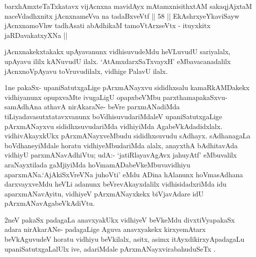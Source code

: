 \begin{shl}
barxhAmxteTaTxkatavx vijAcnxna mavidAyx mAtamxnisithxtAM
sakaqjAjxtaM naceVdadhxnitx jAcnxnameVva na tadaBxveVtf || 58 ||
EkAshrxyeYkaviSayw jAcnxnamoVhw tadhAsati
abAdhikaM tamoV\s tArxseVtx - ituyxkitx jaRDavakatxyXNa ||
\end{shl}

\begin{artha}
jAcnxnakekxtakakx upAyavanunx vidhisuvudeMdu heVLuvudU sariyalalx,
upAyavu ililx kANuvudU ilalx. `AtAmxdarxSaTxvayxH' eMbavacanadalilx 
jAcnxnoVpAyavu toVruvudilalx, vidhige PalavU ilalx.
\end{artha}

\centerline{}

\begin{artha}
1ne pakaSx- upaniSatutxgaLige pArxmANayxvu sididhxsalu kamaRkAMDakekx
vidhiyanunx opupxvaMte ivugaLigU opapxbeVMbu parxthamapakaSxvu-
samAdhAna athavA nirAkaraNe- beVre parxmANadiMda
tiLiyadavasutxtatavxvanunx boVdhisuvudariMdaleV upaniSatutxgaLige
pArxmANayxvu sididhxsuvudariMda vidhiyiMda
AgabeVkAdadidxlalx. vidhivAkayxkUkx pArxmANayxveMbudu sididhxsuvudu
sAdhayx. sAdhanagaLa boVdhaneyiMdale horatu vidhiyeMbudariMda alalx,
anayxthA bAdhitavAda vidhiyU parxmANavAdhiVtu;  udA:- `jatiRlayavAgAvx ja{\null}huyAtf'
eMbuvalilx araNayxtilada gaMjiyiMda  hoVmamADabeVkeMbuvavidhiyu
aparxmANa.`AjAkiSxVreVNa juhoVti' eMdu ADina hAlanunx hoVmasAdhana darxvayxveMdu
heVLi adanunx beVrevAkayxdalilx vidhisidadxriMda idu aparxmANavAyitu,
vidhiyeV pArxmANayxkekx biVjavAdare idU  pArxmANavAgabeVkAdiVtu.
\end{artha}

\begin{artha}
2neV pakaSx padagaLa anavxyakUkx vidhiyeV beVkeMdu divxtiVyapakaSx adara nirAkarANe- padagaLige Aguva anavxyakekx kirxyemAtarx beVkAguvudeV horatu vidhiyu beVkilalx, asitx, asimx itAyxdikirxyApadagaLu upaniSatutxgaLalUlx ive, adariMdale pArxmANayxvirabahuduSeTx .
\end{artha}

